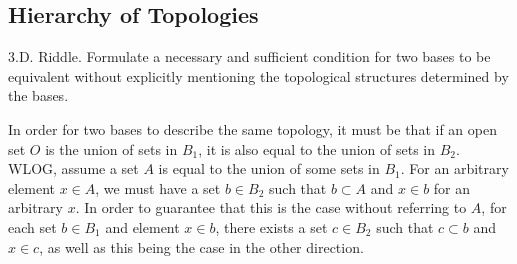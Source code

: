 \subsection{Hierarchy of Topologies}
\begin{majorEx}
3.D. Riddle. Formulate a necessary and sufficient condition for two bases
to be equivalent without explicitly mentioning the topological structures
determined by the bases.
\end{majorEx}
In order for two bases to describe the same topology, it must be that if an open set $O$ is the union of sets in $B_1$, it is also equal to the union of sets in $B_2$. WLOG, assume a set $A$ is equal to the union of some sets in $B_1$. For an arbitrary element $x \in A$, we must have a set $b \in B_2$ such that $b \subset A$ and $x \in b$ for an arbitrary $x$. In order to guarantee that this is the case without referring to $A$, for each set $b \in B_1$ and element $x \in b$, there exists a set $c \in B_2$ such that $c \subset b$ and $x \in c$, as well as this being the case in the other direction.
